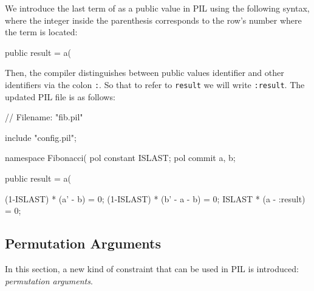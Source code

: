 We introduce the last term of \att as a public value in PIL using the following syntax, where the integer inside the parenthesis corresponds to the row's number where the term is located:
\begin{pil}
    public result = a(%
\end{pil}
Then, the compiler distinguishes between public values identifier and other identifiers via the colon \texttt{:}. So that to refer to \texttt{result} we will write \texttt{:result}. The updated PIL file is as follows:
\begin{pil}
    // Filename: "fib.pil"
    
    include "config.pil";
    
    namespace Fibonacci(%
    pol constant ISLAST;   
    pol commit a, b;
    
    public result = a(%
    
    (1-ISLAST) * (a' - b) = 0;
    (1-ISLAST) * (b' - a - b) = 0;
    ISLAST * (a - :result) = 0; 
\end{pil}


\subsection{Permutation Arguments} \label{sec:permutation-arguments}

In this section, a new kind of constraint that can be used in PIL is introduced: \textit{permutation arguments}.

